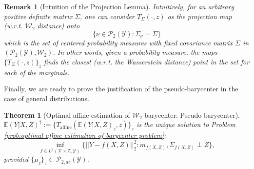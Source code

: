 \documentclass[twoside,11pt]{article}
\newtheorem{thm}{Theorem}[section]{\bfseries}{\itshape}
\newtheorem{rema}{Remark}[section]{\bfseries}{\itshape}
\begin{document}
\begin{rema}[Intuition of the Projection Lemma] \label{r:Intuition of the Projection Lemma}
Intuitively, for an arbitrary positive definite matrix $\Sigma$, one can consider $T_{\Sigma}(\cdot,z)$ as the projection map (w.r.t. $\mathcal{W}_2$ distance) onto
\begin{equation}
\{\nu \in \mathcal{P}_{2}(\mathcal{Y}): \Sigma_{\nu} = \Sigma\}
\end{equation}
which is the set of centered probability measures with fixed covariance matrix $\Sigma$ in $(\mathcal{P}_2(\mathcal{Y}),\mathcal{W}_2)$. In other words, given a probability measure, the maps $\{T_{\Sigma}(\cdot,z)\}_z$ finds the closest (w.r.t. the Wasserstein distance) point in the set for each of the marginals.
\end{rema}

Finally, we are ready to prove the justification of the pseudo-barycenter in the case of general distributions.

\begin{thm}[Optimal affine estimation of $\mathcal{W}_2$ barycenter: Pseudo-barycenter] \label{th:Optimal Affine Estimation of Barycenter: Pseudo-barycenter}
$\mathbb{E}(Y|X,Z)^{\dagger} := \{T_{\text{affine}}(\mathbb{E}(Y|X,Z)_z,z)\}_z$ is the unique solution to Problem \ref{prob:optimal affine estimation of barycenter problem}:
\begin{equation}
\inf_{f \in L^2(\mathcal{X} \times \mathcal{Z}, \mathcal{Y})}  \{ ||Y - f(X,Z)||^2_2: m_{f(X,Z)}, \Sigma_{f(X,Z)} \perp Z\},
\end{equation}
provided $\{\mu_z\}_z \subset \mathcal{P}_{2,ac}(\mathcal{Y})$.
\end{thm}
\end{document}
